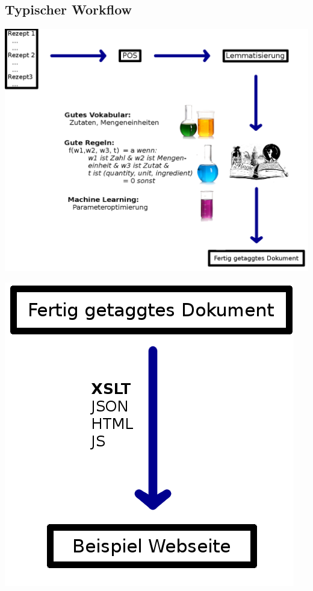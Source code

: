 \documentclass[12pt]{beamer}
\begin{document}
\subsection{Typischer Workflow}
\begin{frame}
	\includegraphics[scale=0.8]{Images/workflow}
\end{frame}

\begin{frame}
	\begin{center}
		\includegraphics[scale=1]{Images/webseite}
	\end{center}
\end{frame}
\end{document}
